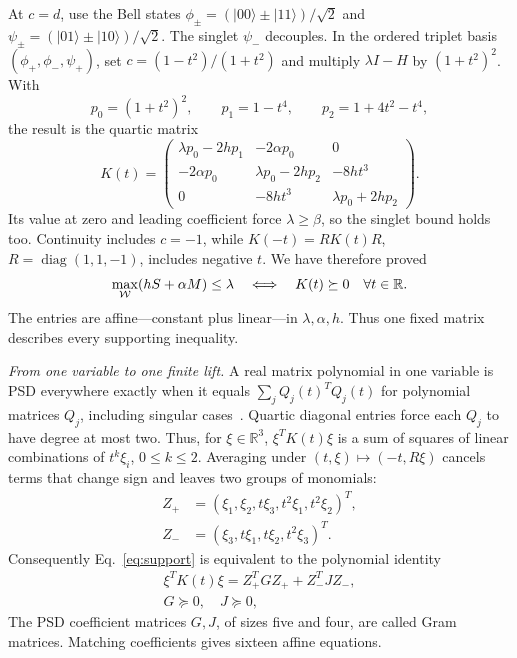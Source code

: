 \documentclass[11pt,twocolumn]{article}
\begin{document}
At $c=d$, use the Bell states $\phi_\pm=(|00\rangle\pm|11\rangle)/\sqrt2$
and $\psi_\pm=(|01\rangle\pm|10\rangle)/\sqrt2$. The singlet $\psi_-$
decouples. In the ordered triplet basis $(\phi_+,\phi_-,\psi_+)$, set
$c=(1-t^2)/(1+t^2)$ and multiply $\lambda I-H$ by $(1+t^2)^2$. With
\[
 p_0=(1+t^2)^2,\qquad p_1=1-t^4,\qquad p_2=1+4t^2-t^4,
\]
the result is the quartic matrix
\begin{equation}
 K(t)=
 \begin{pmatrix}
 \lambda p_0-2hp_1&-2\alpha p_0&0\\
 -2\alpha p_0&\lambda p_0-2hp_2&-8ht^3\\
 0&-8ht^3&\lambda p_0+2hp_2
 \end{pmatrix}.
 \label{eq:K}
\end{equation}
Its value at zero and leading coefficient force $\lambda\geq\beta$,
so the singlet bound holds too. Continuity includes $c=-1$, while
$K(-t)=RK(t)R$, $R=\operatorname{diag}(1,1,-1)$, includes negative $t$. We have therefore proved
\begin{equation}
 \max_{\mathcal W}(hS+\alpha M)\leq\lambda
 \quad\Longleftrightarrow\quad K(t)\succeq0\quad\forall t\in\mathbb R .
 \label{eq:support}
\end{equation}
The entries are affine---constant plus linear---in $\lambda,\alpha,h$.
Thus one fixed matrix describes every supporting inequality.

\emph{From one variable to one finite lift.}
A real matrix polynomial in one variable is PSD everywhere exactly
when it equals $\sum_j Q_j(t)^TQ_j(t)$ for polynomial matrices $Q_j$,
including singular cases~\cite{hs}. Quartic diagonal entries force
each $Q_j$ to have degree at most two. Thus, for $\xi\in\mathbb R^3$,
$\xi^TK(t)\xi$ is a sum of squares of linear combinations of
$t^k\xi_i$, $0\le k\le2$. Averaging under $(t,\xi)\mapsto(-t,R\xi)$
cancels terms that change sign and leaves two groups of monomials:
\[
\begin{aligned}
 Z_+&=(\xi_1,\xi_2,t\xi_3,t^2\xi_1,t^2\xi_2)^T,\\
 Z_-&=(\xi_3,t\xi_1,t\xi_2,t^2\xi_3)^T .
\end{aligned}
\]
Consequently Eq.~\eqref{eq:support} is equivalent to the polynomial identity
\begin{equation}
 \begin{gathered}
 \xi^TK(t)\xi=Z_+^TGZ_++Z_-^TJZ_-,\\
 G\succeq0,\quad J\succeq0,
 \end{gathered}
 \label{eq:gram}
\end{equation}
The PSD coefficient matrices $G,J$, of sizes five and four, are
called Gram matrices. Matching coefficients gives sixteen affine equations.
\end{document}
